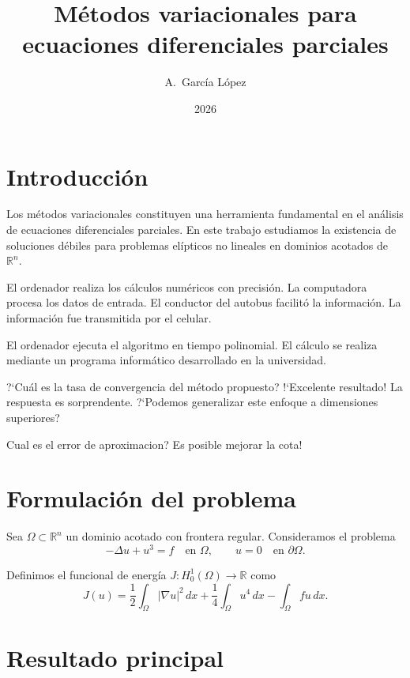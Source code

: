 \documentclass{article}
\title{M\'etodos variacionales para ecuaciones diferenciales parciales}
\author{A.~Garc\'ia L\'opez}
\date{2026}
\begin{document}
\maketitle

\section{Introducci\'on}

Los m\'etodos variacionales constituyen una herramienta fundamental en el
an\'alisis de ecuaciones diferenciales parciales.  En este trabajo estudiamos
la existencia de soluciones d\'ebiles para problemas el\'ipticos no lineales
en dominios acotados de~$\mathbb{R}^n$.

El ordenador realiza los c\'alculos num\'ericos con precisi\'on.  La computadora
procesa los datos de entrada.  El conductor del autobus facilit\'o la informaci\'on.
La informaci\'on fue transmitida por el celular.

El ordenador ejecuta el algoritmo en tiempo polinomial.  El c\'alculo se realiza
mediante un programa inform\'atico desarrollado en la universidad.

?`Cu\'al es la tasa de convergencia del m\'etodo propuesto?  !`Excelente resultado!
La respuesta es sorprendente.  ?`Podemos generalizar este enfoque a dimensiones
superiores?

Cual es el error de aproximacion?  Es posible mejorar la cota!

\section{Formulaci\'on del problema}

Sea $\Omega \subset \mathbb{R}^n$ un dominio acotado con frontera regular.
Consideramos el problema
\begin{equation}
  -\Delta u + u^3 = f \quad \text{en } \Omega, \qquad u = 0 \quad \text{en } \partial\Omega.
\end{equation}

Definimos el funcional de energ\'ia $J \colon H_0^1(\Omega) \to \mathbb{R}$ como
\[
  J(u) = \frac{1}{2}\int_\Omega |\nabla u|^2\,dx + \frac{1}{4}\int_\Omega u^4\,dx
         - \int_\Omega fu\,dx.
\]

\section{Resultado principal}
\end{document}
